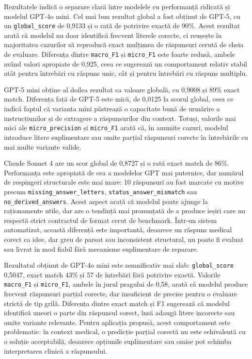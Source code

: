 \documentclass[12pt, a4paper, oneside, romanian]{teza-upb}
\begin{document}
Rezultatele indică o separare clară între modelele cu performanță ridicată și modelul GPT-4o mini. Cel mai bun rezultat global a fost obținut de GPT-5, cu un \texttt{global\_score} de 0,9133 și o rată de potrivire exactă de 90\%. Acest rezultat arată că modelul nu doar identifică frecvent literele corecte, ci reușește în majoritatea cazurilor să reproducă exact mulțimea de răspunsuri cerută de cheia de evaluare. Diferența dintre \texttt{macro\_F1} și \texttt{micro\_F1} este foarte redusă, ambele având valori apropiate de 0,925, ceea ce sugerează un comportament relativ stabil atât pentru întrebări cu răspuns unic, cât și pentru întrebări cu răspuns multiplu.

GPT-5 mini obține al doilea rezultat ca valoare globală, cu 0,9008 și 89\% exact match. Diferența față de GPT-5 este mică, de 0,0125 la scorul global, ceea ce indică faptul că varianta mini păstrează o capacitate bună de urmărire a instrucțiunilor și de extragere a răspunsurilor din context. Totuși, valorile mai mici ale \texttt{micro\_precision} și \texttt{micro\_F1} arată că, în anumite cazuri, modelul introduce litere suplimentare sau omite parțial răspunsuri corecte în întrebările cu mai multe variante valide.

Claude Sonnet 4 are un scor global de 0,8727 și o rată exact match de 86\%. Performanța este apropiată de cea a modelelor GPT mai puternice, dar numărul de respingeri structurale este mai mare: 10 răspunsuri au fost marcate cu motive precum \texttt{missing\_answer\_letters}, \texttt{status\_answer\_mismatch} sau \texttt{no\_derived\_answers}. Acest aspect arată că modelul poate ajunge la raționamente utile, dar are o tendință mai pronunțată de a produce ieșiri care nu respectă strict contractul de format cerut de benchmark. Într-un sistem automatizat, această diferență este importantă, deoarece un răspuns medical corect ca idee, dar greu de parsat sau inconsistent structural, nu poate fi evaluat sau livrat în mod fiabil fără mecanisme suplimentare de reparare.

Rezultatul obținut de GPT-4o mini este semnificativ mai slab: \texttt{global\_score} 0,5047, exact match 43\% și 57 de întrebări fără potrivire exactă. Valorile \texttt{macro\_F1} și \texttt{micro\_F1}, ambele în jurul pragului de 0,58, arată că modelul produce frecvent răspunsuri parțial corecte, dar insuficient de precise pentru o evaluare strictă de tip grilă. Diferența dintre exact match și F1 sugerează că modelul identifică uneori o parte din răspunsul corect, însă adaugă litere incorecte sau omite variante relevante. Pentru aplicația propusă, acest comportament este problematic: în context medical, o predicție parțial corectă nu este echivalentă cu o soluție acceptabilă, deoarece opțiunile suplimentare sau omise pot schimba interpretarea clinică a răspunsului.
\end{document}

